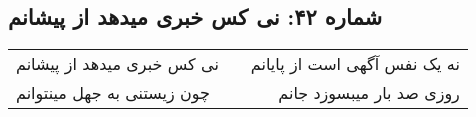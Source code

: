 \begin{center}
\section*{شماره ۴۲: نی کس خبری میدهد از پیشانم}
\label{sec:042}
\begin{longtable}{l p{0.5cm} r}
نی کس خبری میدهد از پیشانم
&&
نه یک نفس آگهی است از پایانم
\\
چون زیستنی به جهل مینتوانم
&&
روزی صد بار میبسوزد جانم
\\
\end{longtable}
\end{center}
